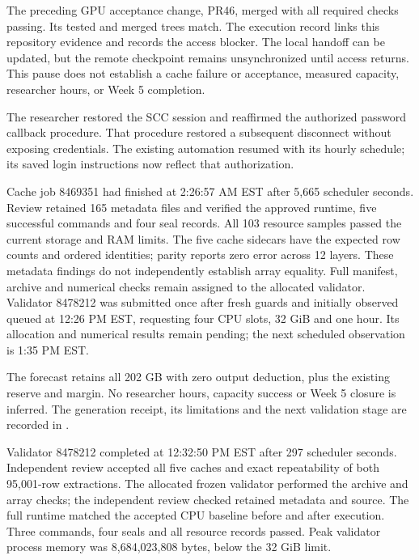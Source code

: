 The preceding GPU acceptance change, PR46, merged with all required checks
passing. Its tested and merged trees match. The execution record links this
repository evidence and records the access blocker. The local handoff can be
updated, but the remote checkpoint remains unsynchronized until access returns.
This pause does not establish a cache failure or acceptance, measured capacity,
researcher hours, or Week 5 completion.


The researcher restored the SCC session and reaffirmed the authorized password
callback procedure. That procedure restored a subsequent disconnect without
exposing credentials. The existing automation resumed with its hourly schedule;
its saved login instructions now reflect that authorization.

Cache job 8469351 had finished at 2:26:57 AM EST after 5,665 scheduler seconds.
Review retained 165 metadata files and verified the approved runtime, five
successful commands and four seal records. All 103 resource samples passed the
current storage and RAM limits. The five cache sidecars have the expected row
counts and ordered identities; parity reports zero error across 12 layers.
These metadata findings do not independently establish array equality. Full
manifest, archive and numerical checks remain assigned to the allocated validator.
Validator 8478212 was submitted once after fresh guards and initially observed
queued at 12:26 PM EST, requesting four CPU slots, 32 GiB and one hour. Its
allocation and numerical results remain pending; the next scheduled observation
is 1:35 PM EST.

The forecast retains all 202 GB with zero output deduction, plus the existing
reserve and margin. No researcher hours, capacity success or Week 5 closure is
inferred. The generation receipt, its limitations and the next validation stage
are recorded in .


Validator 8478212 completed at 12:32:50 PM EST after 297 scheduler seconds.
Independent review accepted all five caches and exact repeatability of both
95,001-row extractions. The allocated frozen validator performed the archive
and array checks; the independent review checked retained metadata and source.
The full runtime matched the accepted CPU baseline before and after execution.
Three commands, four seals and all resource records passed. Peak validator
process memory was 8,684,023,808 bytes, below the 32 GiB limit.

